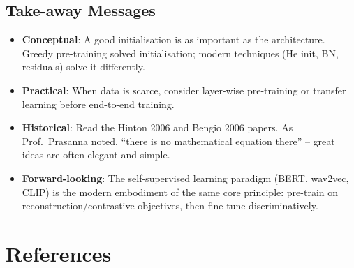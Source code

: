 \documentclass[12pt,a4paper]{article}
\newcommand{\x}{\mathbf{x}}
\begin{document}
\begin{example}
  \begin{center}
  \end{center}
\end{example}

\subsection{Take-away Messages}

\begin{itemize}[leftmargin=*]
  \item \textbf{Conceptual}: A good initialisation is as important as the
        architecture.  Greedy pre-training solved initialisation; modern
        techniques (He init, BN, residuals) solve it differently.
  \item \textbf{Practical}: When data is scarce, consider layer-wise
        pre-training or transfer learning before end-to-end training.
  \item \textbf{Historical}: Read the Hinton 2006 and Bengio 2006 papers.
        As Prof.\ Prasanna noted, ``there is no mathematical equation
        there'' -- great ideas are often elegant and simple.
  \item \textbf{Forward-looking}: The self-supervised learning paradigm
        (BERT, wav2vec, CLIP) is the modern embodiment of the same core
        principle: pre-train on reconstruction/contrastive objectives, then
        fine-tune discriminatively.
\end{itemize}

\newpage

\section*{References}
\end{document}
